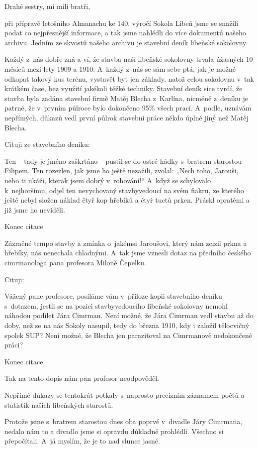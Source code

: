 \documentclass[11pt]{article}
\begin{document}
\medskip

\noindent Drahé sestry, mí milí bratři,

\noindent při přípravě letošního Almanachu ke 140. výročí Sokola Libeň jsme se snažili podat co nejpřesnější informace, a tak jsme nahlédli do více dokumentů našeho archivu. Jedním ze skvostů našeho archivu je stavební deník libeňské sokolovny.

Každý z~nás dobře zná a ví, že stavba naší libeňské sokolovny trvala úžasných 10 měsíců mezi lety 1909 a 1910. A~každý z~nás se sám sebe ptá, jak je možné odkopat takový kus terénu, vystavět byť jen základy, natož celou sokolovnu v~tak krátkém čase, bez využití jakékoli těžké techniky. Stavební deník sice tvrdí, že stavba byla zadána stavební firmě Matěj Blecha z~Karlína, nicméně z~deníku je patrné, že v~prvním půlroce bylo dokončeno 95\% všech prací. A~podle, uznávám nepřímých, důkazů vedl první půlrok stavební práce někdo úplně jiný než Matěj Blecha.

Cituji ze stavebního deníku:

Ten – tady je jméno zaškrtáno – pustil se do ostré hádky s~bratrem starostou Filipem. Ten rozezlen, jak jsme ho ještě nezažili, zvolal: „Nech toho, Jarouši, nebo ti ukáži, kterak jsem dobrý v~rohování!“ A~když se schylovalo k~nejhoršímu, odjel ten nevychovaný stavbyvedoucí na svém fiakru, ze kterého ještě nebyl složen náklad čtyř kop hřebíků a čtyř tuctů prken. Práskl opratěmi a již jsme ho neviděli.

Konec citace

Zázračné tempo stavby a zmínka o~jakémsi Jaroušovi, který nám zcizil prkna a hřebíky, nás nenechala chladnými. A~tak jsme vznesli dotaz na předního českého cimrmanologa pana profesora Miloně Čepelku.

Cituji:

Vážený pane profesore, posíláme vám v~příloze kopii stavebního deníku s~dotazem, jestli se na pozici stavbyvedoucího libeňské sokolovny nemohl náhodou podílet Jára Cimrman. Není možné, že Jára Cimrman vedl stavbu až do doby, než se na nás Sokoly nasupil, tedy do března 1910, kdy i založil tělocvičný spolek SUP? Není možné, že Blecha jen parazitoval na Cimrmanově nedokončené práci?

Konec citace

Tak na tento dopis nám pan profesor neodpověděl.

Nepřímé důkazy se tentokrát potkaly s~naprosto precizním záznamem počtů a statistik našich libeňských starostů.

Protože jsme s~bratrem starostou dnes oba poprvé v~divadle Járy Cimrmana, nedalo nám to a divadlo jsme si opravdu důkladně prohlédli. Všechno si přepočítali. A~já myslím, že je to nad slunce jasné.
\end{document}
